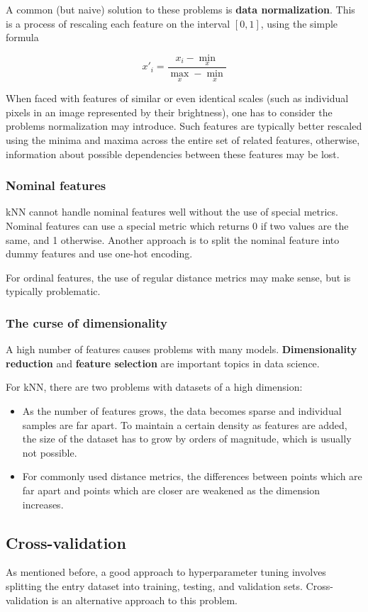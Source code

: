 \documentclass[a4paper]{article}
\begin{document}
	A common (but naive) solution to these problems is \textbf{data normalization}. This
	is a process of rescaling each feature on the interval $[0, 1]$, using the simple
	formula

	$$x'_i = \frac{x_i - \min_x}{\max_x - \min_x}$$

	When faced with features of similar or even identical scales (such as individual
	pixels in an image represented by their brightness), one has to consider the
	problems normalization may introduce. Such features are typically better
	rescaled using the minima and maxima across the entire set of related features,
	otherwise, information about possible dependencies between these features may
	be lost.

	\subsubsection{Nominal features}
	kNN cannot handle nominal features well without the use of special metrics.
	Nominal features can use a special metric which returns 0 if two values
	are the same, and 1 otherwise. Another approach is to split the nominal
	feature into dummy features and use one-hot encoding.

	For ordinal features, the use of regular distance metrics may make sense,
	but is typically problematic.

	\subsubsection{The curse of dimensionality}
	A high number of features causes problems with many models.
	\textbf{Dimensionality reduction} and \textbf{feature selection} are
	important topics in data science.

	For kNN, there are two problems with datasets of a high dimension:
	\begin{itemize}
		\item As the number of features grows, the data becomes sparse and individual
			samples are far apart. To maintain a certain density as features
			are added, the size of the dataset has to grow by orders of magnitude,
			which is usually not possible.
		\item For commonly used distance metrics, the differences between
			points which are far apart and points which are closer are weakened
			as the dimension increases.
	\end{itemize}

	\subsection{Cross-validation}
	As mentioned before, a good approach to hyperparameter tuning involves splitting
	the entry dataset into training, testing, and validation sets. Cross-validation
	is an alternative approach to this problem.
\end{document}

